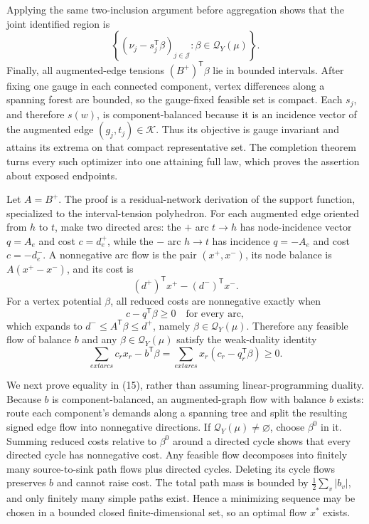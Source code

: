 Applying the same two-inclusion argument before aggregation shows that the joint identified region is
\[
 \left\{(\nu_j-s_j^{\mathsf T}\beta)_{j\in\mathcal J}:
 \beta\in\mathcal Q_Y(\mu)\right\}.
\]
Finally, all augmented-edge tensions \((B^+)^{\mathsf T}\beta\) lie in bounded intervals.  After fixing one gauge in each connected component, vertex differences along a spanning forest are bounded, so the gauge-fixed feasible set is compact.  Each \(s_j\), and therefore \(s(w)\), is component-balanced because it is an incidence vector of the augmented edge \((g_j,t_j)\in\mathcal K\).  Thus its objective is gauge invariant and attains its extrema on that compact representative set.  The completion theorem turns every such optimizer into one attaining full law, which proves the assertion about exposed endpoints.

Let \(A=B^+\).  The proof is a residual-network derivation of the support function, specialized to the interval-tension polyhedron.  For each augmented edge oriented from \(h\) to \(t\), make two directed arcs: the \(+\) arc \(t\to h\) has node-incidence vector \(q=A_e\) and cost \(c=d^+_e\), while the \(-\) arc \(h\to t\) has incidence \(q=-A_e\) and cost \(c=-d^-_e\).  A nonnegative arc flow is the pair \((x^+,x^-)\), its node balance is \(A(x^+-x^-)\), and its cost is
\[
 (d^+)^{\mathsf T}x^+-(d^-)^{\mathsf T}x^-.
\]
For a vertex potential \(\beta\), all reduced costs are nonnegative exactly when
\[
 c-q^{\mathsf T}\beta\ge0\quad\text{for every arc},
\]
which expands to \(d^-\le A^{\mathsf T}\beta\le d^+\), namely \(\beta\in\mathcal Q_Y(\mu)\).  Therefore any feasible flow of balance \(b\) and any \(\beta\in\mathcal Q_Y(\mu)\) satisfy the weak-duality identity
\[
 \sum_{	ext{arcs}}c_rx_r-b^{\mathsf T}\beta
 =\sum_{	ext{arcs}}x_r(c_r-q_r^{\mathsf T}\beta)\ge0. \tag{15}
\]

We next prove equality in (15), rather than assuming linear-programming duality.  Because \(b\) is component-balanced, an augmented-graph flow with balance \(b\) exists: route each component's demands along a spanning tree and split the resulting signed edge flow into nonnegative directions.  If \(\mathcal Q_Y(\mu)\ne\varnothing\), choose \(\beta^0\) in it.  Summing reduced costs relative to \(\beta^0\) around a directed cycle shows that every directed cycle has nonnegative cost.  Any feasible flow decomposes into finitely many source-to-sink path flows plus directed cycles.  Deleting its cycle flows preserves \(b\) and cannot raise cost.  The total path mass is bounded by \(\frac12\sum_v|b_v|\), and only finitely many simple paths exist.  Hence a minimizing sequence may be chosen in a bounded closed finite-dimensional set, so an optimal flow \(x^*\) exists.


